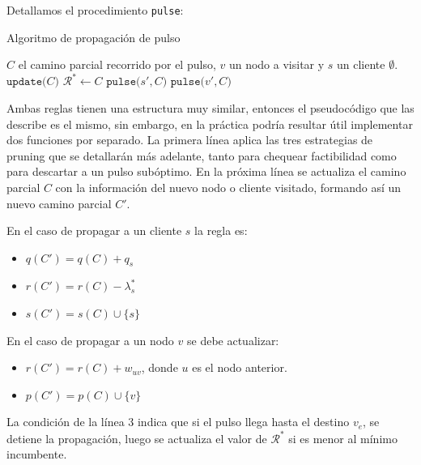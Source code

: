 Detallamos el procedimiento \texttt{pulse}:

\begin{algorithm}[H]
  \caption{Algoritmo de propagación de pulso}
  \label{al:pulse-node-propagation}
  \begin{algorithmic}[1]
  	\Require $C$ el camino parcial recorrido por el pulso, $v$ un nodo a visitar y $s$ un cliente
  	\Ensure $\emptyset$.
            \State $\texttt{update(} C \texttt{)}$
                \State $\mathscr{R}^{*} \gets C$
            \Else
                    \State $\texttt{pulse(} s', C\texttt{)}$
                \EndFor
                    \State $\texttt{pulse(}v', C \texttt{)}$
                \EndFor
            \EndIf
        \EndIf
  \end{algorithmic}
\end{algorithm}

Ambas reglas tienen una estructura muy similar, entonces el pseudocódigo que las describe es el mismo, sin embargo, en la práctica podría resultar útil implementar dos funciones por separado.
La primera línea aplica las tres estrategias de pruning que se detallarán más adelante, tanto para chequear factibilidad como para descartar a un pulso subóptimo.
En la próxima línea se actualiza el camino parcial $C$ con la información del nuevo nodo o cliente visitado, formando así un nuevo camino parcial $C'$.

En el caso de propagar a un cliente $s$ la regla es:
\begin{itemize}
    \item $q(C') = q(C) + q_s$
    \item $r(C') = r(C) - \lambda^{*}_s$
    \item $s(C') = s(C) \cup \{s\}$
\end{itemize}

En el caso de propagar a un nodo $v$ se debe actualizar:

\begin{itemize}
    \item $r(C') = r(C) + w_{uv}$, donde $u$ es el nodo anterior.
    \item $p(C') = p(C) \cup \{v\}$
\end{itemize}

La condición de la línea 3 indica que si el pulso llega hasta el destino $v_e$, se detiene la propagación, luego se actualiza el valor de $\mathscr{R}^{*}$ si es menor al mínimo incumbente.

